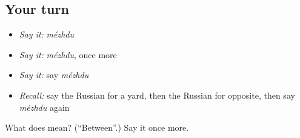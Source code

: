 \subsection*{Your turn}
\begin{itemize}
\raggedright
  \item \emph{Say it:} \emph{mézhdu}
  \item \emph{Say it:} \emph{mézhdu}, once more
  \item \emph{Say it:} say \emph{mézhdu}
  \item \emph{Recall:} say the Russian for a yard, then the Russian for opposite, then say \emph{mézhdu} again
\end{itemize}

\begin{tcolorbox}[breakable,colback=teal!4,colframe=teal!35!black,title={Before you move on}]
What does  mean? (\textquotedblleft{}Between\textquotedblright{}.) Say it once more.
\end{tcolorbox}
